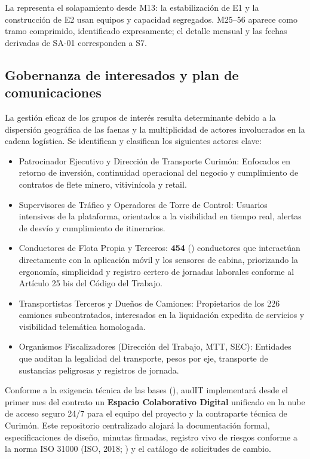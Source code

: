 La  representa el solapamiento desde M13: la estabilización de E1 y la construcción de E2 usan equipos y capacidad segregados. M25–56 aparece como tramo comprimido, identificado expresamente; el detalle mensual y las fechas derivadas de SA-01 corresponden a S7.

\FloatBarrier
\subsection{Gobernanza de interesados y plan de comunicaciones}\label{sec:6-gestion-interesados}\label{sec:06-gobernanza-de-interesados-y-plan-de-comunicaciones}

La gestión eficaz de los grupos de interés resulta determinante debido a la dispersión geográfica de las faenas y la multiplicidad de actores involucrados en la cadena logística. Se identifican y clasifican los siguientes actores clave:

\begin{itemize}
\item Patrocinador Ejecutivo y Dirección de Transporte Curimón: Enfocados en retorno de inversión, continuidad operacional del negocio y cumplimiento de contratos de flete minero, vitivinícola y retail.
\item Supervisores de Tráfico y Operadores de Torre de Control: Usuarios intensivos de la plataforma, orientados a la visibilidad en tiempo real, alertas de desvío y cumplimiento de itinerarios.
\item Conductores de Flota Propia y Terceros: \textbf{454} () conductores que interactúan directamente con la aplicación móvil y los sensores de cabina, priorizando la ergonomía, simplicidad y registro certero de jornadas laborales conforme al Artículo 25 bis del Código del Trabajo.
\item Transportistas Terceros y Dueños de Camiones: Propietarios de los 226 camiones subcontratados, interesados en la liquidación expedita de servicios y visibilidad telemática homologada.
\item Organismos Fiscalizadores (Dirección del Trabajo, MTT, SEC): Entidades que auditan la legalidad del transporte, pesos por eje, transporte de sustancias peligrosas y registros de jornada.
\end{itemize}

Conforme a la exigencia técnica de las bases (), audIT implementará desde el primer mes del contrato un \textbf{Espacio Colaborativo Digital} unificado en la nube de acceso seguro 24/7 para el equipo del proyecto y la contraparte técnica de Curimón. Este repositorio centralizado alojará la documentación formal, especificaciones de diseño, minutas firmadas, registro vivo de riesgos conforme a la norma ISO 31000 (ISO, 2018; ) y el catálogo de solicitudes de cambio.

